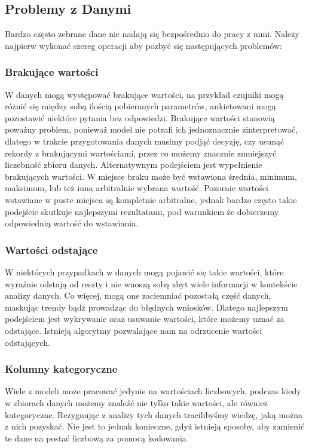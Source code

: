 \documentclass{book}
\begin{document}
\subsection{Problemy z Danymi}

Bardzo często zebrane dane nie nadają się bezpośrednio do pracy z nimi. 
Należy najpierw wykonać szereg operacji aby pozbyć się następujących 
problemów:   
\subsubsection{Brakujące wartości}
W danych mogą występować brakujące wartości, na przykład czujniki 
mogą różnić się między sobą ilością pobieranych parametrów, 
ankietowani mogą pozostawić niektóre pytania bez odpowiedzi. 
Brakujące wartości stanowią poważny problem, ponieważ model nie 
potrafi ich jednoznacznie zinterpretować, dlatego w trakcie 
przygotowania danych musimy podjąć decyzję, czy usunąć rekordy z 
brakującymi wartościami, przez co możemy znacznie zmniejszyć 
liczebność zbioru danych. Alternatywnym podejściem jest wypełnienie 
brakujących wartości. W miejsce braku może być wstawiona średnia, 
minimum, maksimum, lub też inna arbitralnie wybrana wartość. 
Pozornie wartości wstawiane w puste miejsca są kompletnie arbitralne, 
jednak bardzo często takie podejście skutkuje najlepszymi rezultatami, 
pod warunkiem że dobierzemy odpowiednią wartość do wstawiania. 
\subsubsection{Wartości odstające}
W niektórych przypadkach w danych mogą pojawić się takie wartości, 
które wyraźnie odstają od reszty i nie wnoszą sobą zbyt wiele 
informacji w kontekście analizy danych. Co więcej, mogą one 
zaciemniać pozostałą część danych, maskując trendy bądź prowadząc 
do błędnych wniosków. Dlatego najlepszym podejściem jest wykrywanie 
oraz usuwanie wartości, które możemy uznać za odstające. 
Istnieją algorytmy pozwalające nam na odrzucenie wartości odstających.
\subsubsection{Kolumny kategoryczne}
Wiele z modeli może pracować jedynie na wartościach liczbowych, 
podczas kiedy w zbiorach danych możemy znaleźć nie tylko takie wartości, 
ale również kategoryczne. Rezygnując z analizy tych danych tracilibyśmy 
wiedzę, jaką można z nich pozyskać. Nie jest to jednak konieczne, 
gdyż istnieją sposoby, aby zamienić te dane na postać liczbową za 
pomocą kodowania
\end{document}
